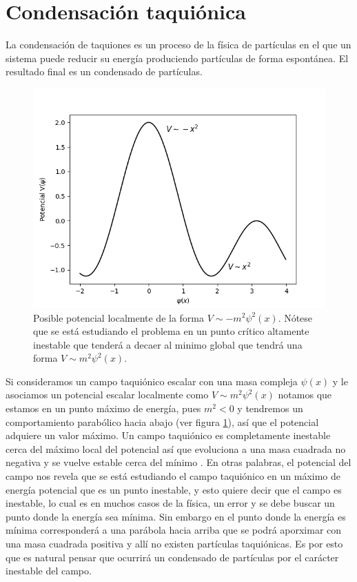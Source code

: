 \documentclass[twocolumn,preprintnumbers,amsmath,amssymb]{revtex4}
\begin{document}
 \section{Condensación taquiónica}
 
 La condensación de taquiones es un proceso de la física de partículas en el que un sistema puede reducir su energía produciendo partículas de forma espontánea. El resultado final es un condensado de partículas.
 
\begin{figure}[htb!]
\centering
\includegraphics[width=0.8\columnwidth]{potencial.png}
\caption{ Posible potencial localmente de la forma $V \sim -m^2 \psi^2(x)$. Nótese que se está estudiando el problema en un punto crítico altamente inestable que tenderá a decaer al minimo global que tendrá una forma $V \sim m^2 \psi^2(x)$. }
\label{fig:potencial}
\end{figure}
 
 Si consideramos un campo taquiónico escalar con una masa compleja $\psi(x)$ y le asociamos un potencial escalar localmente como $V \sim m^2 \psi^2(x) $ notamos que estamos en un punto máximo de energía, pues $m^2<0$ y tendremos un comportamiento parabólico hacia abajo (ver figura \ref{fig:potencial}), así que el potencial adquiere un valor máximo. Un campo taquiónico es completamente inestable cerca del máximo local del potencial así que evoluciona a una masa cuadrada no negativa y se vuelve estable cerca del mínimo \cite{copeland2005needed}. En otras palabras, el potencial del campo nos revela que se está estudiando el campo taquiónico en un máximo de energía potencial que es un punto inestable, y esto quiere decir que el campo es inestable, lo cual es en muchos casos de la física, un error y se debe buscar un punto donde la energía sea mínima. Sin embargo en el punto donde la energía es mínima corresponderá a una parábola hacia arriba que se podrá aporximar con una masa cuadrada positiva y allí no existen partículas taquiónicas. Es por esto que es natural pensar que ocurrirá un condensado de partículas por el carácter inestable del campo.
\end{document}
